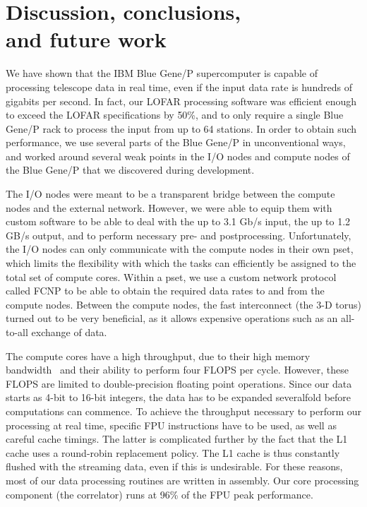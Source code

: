 \documentclass{sig-alternate}
\begin{document}


\section{Discussion, conclusions, \\ and future work}
\label{sec:conclusions}

We have shown that the IBM Blue Gene/P supercomputer is capable of
processing telescope data in real time, even if the input data rate is
hundreds of gigabits per second. In fact, our LOFAR processing
software was efficient enough to exceed the LOFAR specifications by
50\%, and to only require a single Blue Gene/P rack to process the input
from up to 64 stations. In order to obtain such performance, we use
several parts of the Blue Gene/P in unconventional
ways, and worked around several weak points in the I/O nodes and compute
nodes of the Blue Gene/P that we discovered during development.

The I/O nodes were meant to be a transparent bridge between the
compute nodes and the external network. However, we were able to equip
them with custom software to be able to deal with the up to 3.1 Gb/s
input, the up to 1.2 GB/s output, and to perform necessary pre- and
postprocessing. Unfortunately, the I/O nodes can only communicate with
the compute nodes in their own pset, which limits the flexibility with
which the tasks can efficiently be assigned to the total set of
compute cores. Within a pset, we use a custom network protocol called
FCNP to be able to obtain the required data rates to and from the
compute nodes. Between the compute nodes, the fast interconnect (the
3-D torus) turned out to be very beneficial, as it allows expensive
operations such as an all-to-all exchange of data.

The compute cores have a high throughput, due to their high memory
bandwidth~\cite{Nieuwpoort:09} and their ability to perform four FLOPS
per cycle. However, these FLOPS are limited to double-precision
floating point operations. Since our data starts as 4-bit to 16-bit
integers, the data has to be expanded severalfold before computations
can commence. To achieve the throughput necessary to perform our
processing at real time, specific FPU instructions have to be used, as
well as careful cache timings. The latter is complicated further by
the fact that the L1 cache uses a round-robin replacement policy. The
L1 cache is thus constantly flushed with the streaming data, even if
this is undesirable. For these reasons, most of our data processing
routines are written in assembly. Our core processing component (the
correlator) runs at 96\% of the FPU peak performance.
\end{document}
